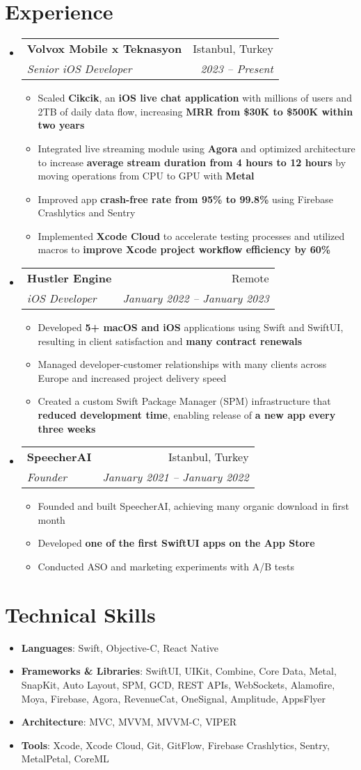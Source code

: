 \documentclass[letterpaper,11pt]{article}
\makeatletter
\newcommand{\resumeItem}[1]{
  \item\small{
    {#1 \vspace{-2pt}}
  }
}
\newcommand{\resumeSubheading}[4]{
  \vspace{-1pt}\item
    \begin{tabular*}{0.97\textwidth}[t]{l@{\extracolsep{\fill}}r}
      \textbf{#1} & #2 \\
      \textit{\small#3} & \textit{\small #4} \\
    \end{tabular*}\vspace{-6pt}
}
\newcommand{\resumeSubHeadingListStart}{\begin{itemize}[leftmargin=0.15in, label={}, itemsep=-2pt]}
\newcommand{\resumeSubHeadingListEnd}{\end{itemize}}
\newcommand{\resumeItemListStart}{\begin{itemize}[itemsep=-2pt]}
\newcommand{\resumeItemListEnd}{\end{itemize}\vspace{-4pt}}
\makeatother
\begin{document}
\section{Experience}
\vspace{-2pt}
  \resumeSubHeadingListStart
    \resumeSubheading
      {Volvox Mobile x Teknasyon}{Istanbul, Turkey}
      {Senior iOS Developer}{2023 -- Present}
      \resumeItemListStart
        \resumeItem{Scaled \textbf{Cikcik}, an \textbf{iOS live chat application} with millions of users and 2TB of daily data flow, increasing \textbf{MRR from \$30K to \$500K within two years}}
        \resumeItem{Integrated live streaming module using \textbf{Agora} and optimized architecture to increase \textbf{average stream duration from 4 hours to 12 hours} by moving operations from CPU to GPU with \textbf{Metal}}
        \resumeItem{Improved app \textbf{crash-free rate from 95\% to 99.8\%} using Firebase Crashlytics and Sentry}
        \resumeItem{Implemented \textbf{Xcode Cloud} to accelerate testing processes and utilized macros to \textbf{improve Xcode project workflow efficiency by 60\%}}
      \resumeItemListEnd
    
    \resumeSubheading
      {Hustler Engine}{Remote}
      {iOS Developer}{January 2022 -- January 2023}
      \resumeItemListStart
        \resumeItem{Developed \textbf{5+ macOS and iOS} applications using Swift and SwiftUI, resulting in client satisfaction and \textbf{many contract renewals}}
        \resumeItem{Managed developer-customer relationships with many clients across Europe and increased project delivery speed}
        \resumeItem{Created a custom Swift Package Manager (SPM) infrastructure that \textbf{reduced development time}, enabling release of \textbf{a new app every three weeks}}
      \resumeItemListEnd
      
    \resumeSubheading
      {SpeecherAI}{Istanbul, Turkey}
      {Founder}{January 2021 -- January 2022}
      \resumeItemListStart
        \resumeItem{Founded and built SpeecherAI, achieving many organic download in first month}
        \resumeItem{Developed \textbf{one of the first SwiftUI apps on the App Store}}
        \resumeItem{Conducted ASO and marketing experiments with A/B tests}
      \resumeItemListEnd
  \resumeSubHeadingListEnd

\section{Technical Skills}
\vspace{-2pt}
  \resumeSubHeadingListStart
    \item{
      \textbf{Languages}{: Swift, Objective-C, React Native}
    }
    \item{
      \textbf{Frameworks \& Libraries}{: SwiftUI, UIKit, Combine, Core Data, Metal, SnapKit, Auto Layout, SPM, GCD, REST APIs, WebSockets, Alamofire, Moya, Firebase, Agora, RevenueCat, OneSignal, Amplitude, AppsFlyer}
    }
    \item{
      \textbf{Architecture}{: MVC, MVVM, MVVM-C, VIPER}
    }
    \item{
      \textbf{Tools}{: Xcode, Xcode Cloud, Git, GitFlow, Firebase Crashlytics, Sentry, MetalPetal, CoreML}
    }
  \resumeSubHeadingListEnd
\end{document}
